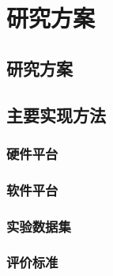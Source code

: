 \chapter{研究方案}

\section{研究方案}



\section{主要实现方法}

\subsection{硬件平台}


\subsection{软件平台}


\subsection{实验数据集}


\subsection{评价标准}

